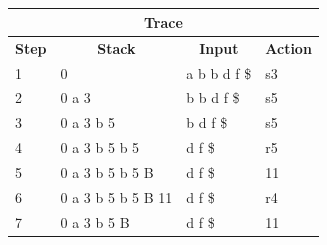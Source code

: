 \documentclass{article}
\begin{document}
\subsection{}
\begin{latin}
\begin{table}[H]
\begin{tabular}{|llll|}
\hline
\multicolumn{4}{|c|}{\textbf{Trace}}                                                                                                                                               \\ \hline
\multicolumn{1}{|c|}{\textbf{Step}} & \multicolumn{1}{c|}{\textbf{Stack}}                             & \multicolumn{1}{c|}{\textbf{Input}} & \multicolumn{1}{c|}{\textbf{Action}} \\ \hline
\multicolumn{1}{|l|}{1}             & \multicolumn{1}{l|}{{\color[HTML]{0000FF} 0}}                   & \multicolumn{1}{l|}{a b b d f \$}   & s3                                   \\ \hline
\multicolumn{1}{|l|}{2}             & \multicolumn{1}{l|}{{\color[HTML]{0000FF} 0 a 3}}               & \multicolumn{1}{l|}{b b d f \$}     & s5                                   \\ \hline
\multicolumn{1}{|l|}{3}             & \multicolumn{1}{l|}{{\color[HTML]{0000FF} 0 a 3 b 5}}           & \multicolumn{1}{l|}{b d f \$}       & s5                                   \\ \hline
\multicolumn{1}{|l|}{4}             & \multicolumn{1}{l|}{{\color[HTML]{0000FF} 0 a 3 b 5 b 5}}       & \multicolumn{1}{l|}{d f \$}         & r5                                   \\ \hline
\multicolumn{1}{|l|}{5}             & \multicolumn{1}{l|}{{\color[HTML]{0000FF} 0 a 3 b 5 b 5 B}}     & \multicolumn{1}{l|}{d f \$}         & {\color[HTML]{0000FF} 11}            \\ \hline
\multicolumn{1}{|l|}{6}             & \multicolumn{1}{l|}{{\color[HTML]{0000FF} 0 a 3 b 5 b 5 B 11}}  & \multicolumn{1}{l|}{d f \$}         & r4                                   \\ \hline
\multicolumn{1}{|l|}{7}             & \multicolumn{1}{l|}{{\color[HTML]{0000FF} 0 a 3 b 5 B}}         & \multicolumn{1}{l|}{d f \$}         & {\color[HTML]{0000FF} 11}            \\ \hline

\end{tabular}
\end{table}
\end{latin}
\end{document}
